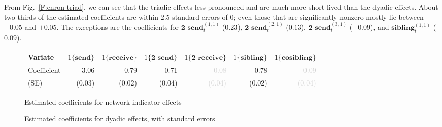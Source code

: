 \documentclass[final]{statsoc}
\begin{document}
From Fig.~\ref{F:enron-triad}, we can see that the triadic effects less
pronounced and are much more short-lived than the dyadic effects.  About
two-thirds of the estimated coefficients are within $2.5$ standard errors of
$0$; even those that are significantly nonzero mostly lie between $-0.05$ and
$+0.05$.  The exceptions are the coefficients for
$\textbf{2-send}_t^{(1,1)}$ ($0.23$),
$\textbf{2-send}_t^{(2,1)}$ ($0.13$),
$\textbf{2-send}_t^{(3,1)}$ ($-0.09$),
and
$\textbf{sibling}_t^{(1,1)}$ ($0.09$).


\begin{figure}
\centering
\footnotesize
\begin{tabular}{lrrrrrr}
\toprule
Variate
& $1\{\textbf{send}\}$
& $1\{\textbf{receive}\}$
& $1\{\textbf{2-send}\}$
& $1\{\textbf{2-receive}\}$
& $1\{\textbf{sibling}\}$
& $1\{\textbf{cosibling}\}$
\\
\midrule
Coefficient
& 3.06
& 0.79
& 0.71
& \textcolor{LightGray}{0.08}
& 0.78
& \textcolor{LightGray}{0.09}
\\
(SE)
& \tiny{(0.03)}
& \tiny{(0.02)}
& \tiny{(0.04)}
& \textcolor{LightGray}{\tiny{(0.04)}}
& \tiny{(0.02)}
& \textcolor{LightGray}{\tiny{(0.04)}}
\\
\bottomrule
\end{tabular}
\normalsize
\caption{Estimated coefficients for network indicator effects}
\label{F:enron-net-indicator}
\end{figure}

\begin{figure}
  \centering
  \caption{Estimated coefficients for dyadic effects, with standard errors}
  \label{F:enron-dyad}
\end{figure}
\end{document}
